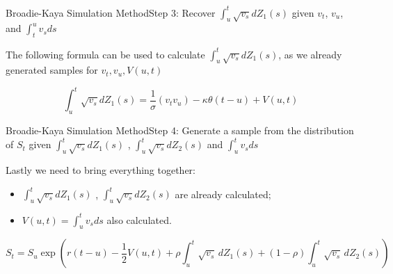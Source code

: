 \begin{frame}{Broadie-Kaya Simulation Method}{Step 3: Recover $\int_{u}^t \sqrt{v_s} dZ_1(s)$ given $v_t$, $v_u$, and
        $\int_{t}^u v_s ds$}

    The following formula can be used to calculate $\int_{u}^t \sqrt{v_s} dZ_1(s)$, as we already generated samples for $v_t , v_u, V(u, t)$


    \begin{equation}
        \int_{u}^t \sqrt{v_s} dZ_1(s) = \frac{1}{\sigma}(v_t v_u) - \kappa\theta(t-u) + V(u, t)
    \end{equation}
    
    

    
\end{frame}





\begin{frame}{Broadie-Kaya Simulation Method}{Step 4: Generate a sample from the distribution of $S_t$ given $\int_{u}^t \sqrt{v_s} dZ_1(s)$ , $\int_{u}^t \sqrt{v_s} dZ_2(s)$ and $\int_{u}^t v_s ds$}

    Lastly we need to bring everything together:
    \begin{itemize}
        \item $\int_{u}^t \sqrt{v_s} dZ_1(s)$ , $\int_{u}^t \sqrt{v_s} dZ_2(s)$ are already calculated;
        \item $V(u, t) = \int_{u}^t v_s ds $ also calculated.
    \end{itemize}
    \begin{equation}
        S_t = S_u \exp{\left( r(t-u)-\frac{1}{2} V(u, t)  + \rho\int_{u}^{t} \sqrt{v_s} \, dZ_1(s) + (1-\rho)\int_{u}^{t} \sqrt{v_s} \, dZ_2(s)  \right)}
    \end{equation}

        
\end{frame}


